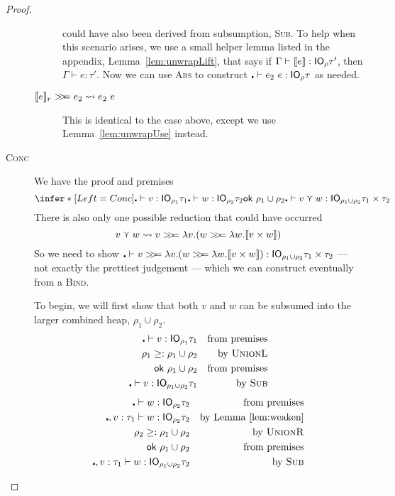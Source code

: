 \begin{proof}
\begin{description}
\begin{description}
      could have also been derived from subsumption, \textsc{Sub}. To
      help when this scenario arises, we use a small helper lemma
      listed in the appendix, Lemma~\ref{lem:unwrapLift}, that says if
      $\Gamma \vdash [\![ e]\!] : \mathsf{IO}_\rho \tau'$, then
      $\Gamma \vdash e : \tau'$. Now we can use \textsc{Abs} to construct
      ${\centerdot \vdash e_2 \ e : \mathsf{IO}_\rho \tau}$ as needed.
    \item[$\use{r}{e} \bind e_2 \leadsto e_2 \ e$] This is identical to the
      case above, except we use Lemma~\ref{lem:unwrapUse} instead.
    \end{description}
  \item[\rm\textsc{Conc}] We have the proof and premises
    \[ \infer*[Left=Conc]{\centerdot \vdash v : \IO_{\rho_1} \tau_1 \\ \centerdot \vdash w : \IO_{\rho_2} \tau_2 \\
      \textsf{ok} \ \rho_1 \cup \rho_2}
      { \centerdot \vdash v \curlyvee w : \IO_{\rho_1 \cup \rho_2} \tau_1 \times \tau_2 } \]
    There is also only one possible reduction that could have
    occurred
    \[ v \curlyvee w \leadsto v \bind \lambda v . (w \bind \lambda w . \lift{v \times w}) \]
    So we need to show ${\centerdot \vdash v \bind \lambda v . (w \bind \lambda w . \lift{v
        \times w}) : \IO_{\rho_1 \cup \rho_2} \tau_1 \times \tau_2}$ --- not exactly the
    prettiest judgement --- which we can construct eventually from a \textsc{Bind}.

    To begin, we will first show that both $v$ and $w$ can be subsumed
    into the larger combined heap, $\rho_1 \cup \rho_2$.
    \begin{align*}
      \centerdot \vdash v : \mathsf{IO}_{\rho_1} \tau_1 && \text{from premises} \\
      \rho_1 \geq: \rho_1 \cup \rho_2 && \text{by \textsc{UnionL}} \\
      \textsf{ok} \ \rho_1 \cup \rho_2 && \text{from premises} \\
      \centerdot \vdash v : \mathsf{IO}_{\rho_1 \cup \rho_2} \tau_1 && \text{by \textsc{Sub}}
    \end{align*}
    \begin{align*}
      \centerdot \vdash w : \mathsf{IO}_{\rho_2} \tau_2 && \text{from premises} \\
      \centerdot , v : \tau_1 \vdash w : \mathsf{IO}_{\rho_2} \tau_2 && \text{by Lemma~\ref{lem:weaken}} \\
      \rho_2 \geq: \rho_1 \cup \rho_2 && \text{by \textsc{UnionR}} \\
      \textsf{ok} \ \rho_1 \cup \rho_2 && \text{from premises} \\
      \centerdot , v : \tau_1 \vdash w : \mathsf{IO}_{\rho_1 \cup \rho_2} \tau_2 && \text{by \textsc{Sub}}
    \end{align*}


\end{description}
\end{proof}
